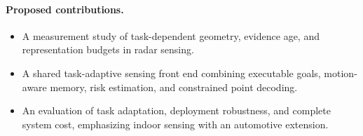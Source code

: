 \paragraph{Proposed contributions.}
\begin{itemize}
\item A measurement study of task-dependent geometry, evidence age, and representation budgets in radar sensing.
\item A shared task-adaptive sensing front end combining executable goals, motion-aware memory, risk estimation, and constrained point decoding.
\item An evaluation of task adaptation, deployment robustness, and complete system cost, emphasizing indoor sensing with an automotive extension.
\end{itemize}
